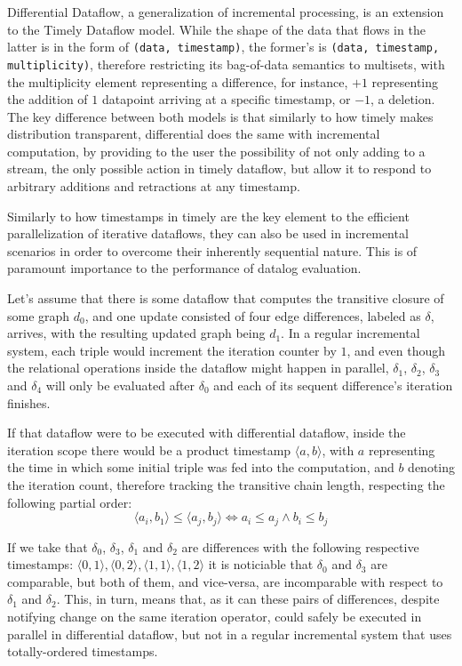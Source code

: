 \documentclass[sigconf,screen,review,natbib]{acmart}
\theoremstyle{definition}
\begin{document}
Differential Dataflow, a generalization of incremental processing, is an extension to the Timely Dataflow model. While the shape of the data that flows in the latter is
in the form of \verb|(data, timestamp)|, the former's is \verb|(data, timestamp, multiplicity)|, therefore restricting its bag-of-data semantics to multisets, with
the multiplicity element representing a difference, for instance, $+1$ representing the addition of $1$ datapoint arriving at a specific timestamp, or $-1$, a deletion. The
key difference between both models is that similarly to how timely makes distribution transparent, differential does the same with incremental computation, by providing to the
user the possibility of not only adding to a stream, the only possible action in timely dataflow, but allow it to respond to arbitrary additions and retractions at any timestamp.

Similarly to how timestamps in timely are the key element to the efficient parallelization of iterative dataflows, they can also be used in incremental scenarios in order to
overcome their inherently sequential nature. This is of paramount importance to the performance of datalog evaluation.

Let's assume that there is some dataflow that computes the transitive closure of some graph $d_0$, and one update consisted of four edge differences, labeled as $\delta$, arrives, with
the resulting updated graph being $d_1$. In a regular incremental system, each triple would increment the iteration counter by $1$, and even though the relational operations inside
the dataflow might happen in parallel, $\delta_1$, $\delta_2$, $\delta_3$ and $\delta_4$ will only be evaluated after $\delta_0$ and each of its sequent difference's iteration finishes.

If that dataflow were to be executed with differential dataflow, inside the iteration scope there would be a product timestamp $\langle a, b \rangle$, with $a$ representing the time
in which some initial triple was fed into the computation, and $b$ denoting the iteration count, therefore tracking the transitive chain length, respecting the
following partial order: \[\langle a_i, b_1 \rangle \leq \langle a_j, b_j \rangle \iff a_i \leq a_j \wedge b_i \leq b_j\]

If we take that $\delta_0$, $\delta_3$, $\delta_1$ and $\delta_2$ are differences with the following respective timestamps: $\langle 0, 1 \rangle, \langle 0, 2 \rangle, \langle 1, 1 \rangle, \langle 1, 2 \rangle$ it
is noticiable that $\delta_0$ and $\delta_3$ are comparable, but both of them, and vice-versa, are incomparable with respect to $\delta_1$ and $\delta_2$. This, in turn, means that, as it can
these pairs of differences, despite notifying change on the same iteration operator, could safely be executed in parallel in differential dataflow, but not in a regular
incremental system that uses totally-ordered timestamps.
\end{document}
